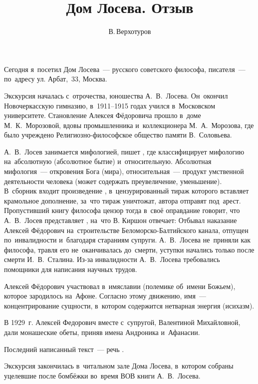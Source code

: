 \documentclass[a4paper]{article}
\title{Дом Лосева. Отзыв}
\author{В.\,Верхотуров}
\affil{БСБО-05-20 \\ РТУ МИРЭА}
\begin{document}
	\maketitle
	
	Сегодня я~посетил Дом Лосева~--- русского советского философа, писателя~--- по~адресу ул. Арбат,~33, Москва. 
	
	Экскурсия началась с~отрочества, юношества А.~В.~Лосева. Он~окончил Новочеркасскую гимназию, в~1911--1915 годах учился в~Московском университете. Становление Алексея Фёдоровича прошло в~доме М.~К.~Морозовой, вдовы промышленника и~коллекционера М.~А.~Морозова, где было учреждено Религиозно-философское общество памяти В.~Соловьева. 
	
	А.~В.~Лосев занимается мифологией, пишет , где классифицирует мифологию на~абсолютную (абсолютное бытие) и~относительную. Абсолютная мифология~--- откровения Бога (мира), относительная~--- продукт умственной деятельности человека (может содержать преувеличение, уменьшение). В~сборник входит произведение , в~цензурированный тираж которого вставляет крамольное дополнение, за~что тираж уничтожат, автора отправят под~арест. Пропустивший книгу философа цензор тогда в~своё оправдание говорит, что А.~В.~Лосев представляет , на~что В. Киршон отвечает:  Отбывал наказание Алексей Фёдорович на~строительстве Беломорско-Балтийского канала, отпущен по~инвалидности и~благодаря стараниям супруги. А.~В.~Лосева не~приняли как философа, травля его не~оканчивалась до~смерти, уступки начались только после смерти И.~В.~Сталина. Из-за инвалидности А.~В.~Лосева требовались помощники для написания научных трудов.
	
	Алексей Фёдорович участвовал в~имяславии (полемике об~имени Божьем), которое зародилось на~Афоне. Согласно этому движению, имя~--- концентрирование сущности, в~котором содержится нетварная энергия (исихазм).
	
	В 1929~г. Алексей Федорович вместе с~супругой, Валентиной Михайловной, дали монашеские обеты, приняв имена Андроника и~Афанасии.
	
	Последний написанный текст~--- речь .
	
	Экскурсия закончилась в~читальном зале Дома Лосева, в~котором собраны уцелевшие после бомбёжки во~время ВОВ книги А.~В.~Лосева.
	
\end{document}
